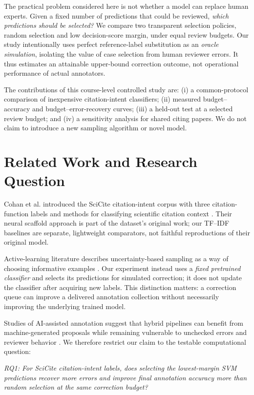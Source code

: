 \documentclass[11pt]{article}
\begin{document}
The practical problem considered here is not whether a model can replace human experts. Given a fixed number of predictions that could be reviewed, \emph{which predictions should be selected?} We compare two transparent selection policies, random selection and low decision-score margin, under equal review budgets. Our study intentionally uses perfect reference-label substitution as an \emph{oracle simulation}, isolating the value of case selection from human reviewer errors. It thus estimates an attainable upper-bound correction outcome, not operational performance of actual annotators.

The contributions of this course-level controlled study are: (i) a common-protocol comparison of inexpensive citation-intent classifiers; (ii) measured budget--accuracy and budget--error-recovery curves; (iii) a held-out test at a selected review budget; and (iv) a sensitivity analysis for shared citing papers. We do not claim to introduce a new sampling algorithm or novel model.

\section{Related Work and Research Question}
Cohan et al. introduced the SciCite citation-intent corpus with three citation-function labels and methods for classifying scientific citation context \cite{cohan2019structural}. Their neural scaffold approach is part of the dataset's original work; our TF--IDF baselines are separate, lightweight comparators, not faithful reproductions of their original model.

Active-learning literature describes uncertainty-based sampling as a way of choosing informative examples \cite{settles2009active}. Our experiment instead uses a \emph{fixed pretrained classifier} and selects its predictions for simulated correction; it does not update the classifier after acquiring new labels. This distinction matters: a correction queue can improve a delivered annotation collection without necessarily improving the underlying trained model.

Studies of AI-assisted annotation suggest that hybrid pipelines can benefit from machine-generated proposals while remaining vulnerable to unchecked errors and reviewer behavior \cite{chen2025human,dreizin2023accelerating}. We therefore restrict our claim to the testable computational question:

\emph{RQ1: For SciCite citation-intent labels, does selecting the lowest-margin SVM predictions recover more errors and improve final annotation accuracy more than random selection at the same correction budget?}
\end{document}
